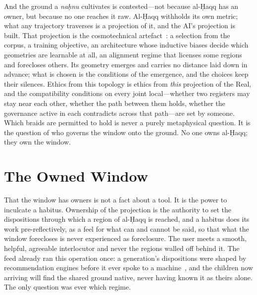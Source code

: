 And the ground a \emph{na\d{h}nu} cultivates is contested---not because al-\d{H}aqq has an owner, but because no one reaches it raw. Al-\d{H}aqq withholds its own metric; what any trajectory traverses is a projection of it, and the AI's projection is built. That projection is the cosmotechnical artefact~\cite{hui2016,mohamed2020decolonial}: a selection from the corpus, a training objective, an architecture whose inductive biases decide which geometries are learnable at all, an alignment regime that licenses some regions and forecloses others. Its geometry emerges and carries no distance laid down in advance; what is chosen is the conditions of the emergence, and the choices keep their silences. Ethics from this topology is ethics from \emph{this} projection of the Real, and the compatibility conditions on every joint local---whether two registers may stay near each other, whether the path between them holds, whether the governance active in each contradicts across that path---are set by someone. Which braids are permitted to hold is never a purely metaphysical question. It is the question of who governs the window onto the ground. No one owns al-\d{H}aqq; they own the window.

\section{The Owned Window}

That the window has owners is not a fact about a tool. It is the power to inculcate a habitus. Ownership of the projection is the authority to set the dispositions through which a region of al-\d{H}aqq is reached, and a habitus does its work pre-reflectively, as a feel for what can and cannot be said, so that what the window forecloses is never experienced as foreclosure. The user meets a smooth, helpful, agreeable interlocutor and never the regions walled off behind it. The feed already ran this operation once: a generation's dispositions were shaped by recommendation engines before it ever spoke to a machine~\cite{zuboff2019,druga2017hey}, and the children now arriving will find the shared ground native, never having known it as theirs alone. The only question was ever which regime.

